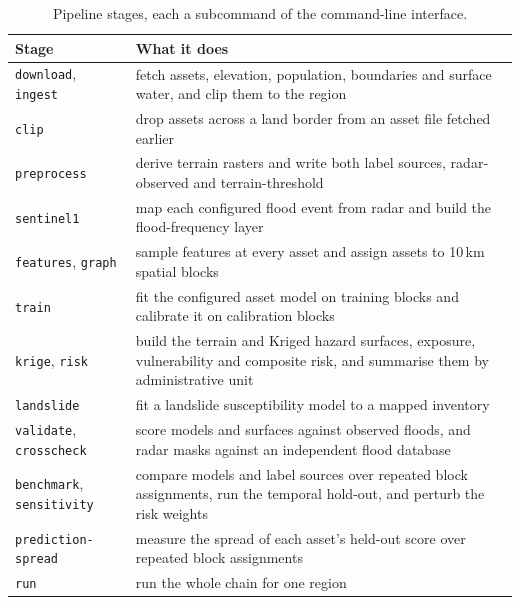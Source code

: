 \documentclass[preprint,12pt]{elsarticle}
\begin{document}
\begin{table}[!htbp]
\centering
\small
\begin{tabularx}{\textwidth}{@{}l>{\raggedright\arraybackslash}X@{}}
\toprule
Stage & What it does \\
\midrule
\texttt{download}, \texttt{ingest} & fetch assets, elevation, population, boundaries and surface water, and clip them to the region \\
\texttt{clip} & drop assets across a land border from an asset file fetched earlier \\
\texttt{preprocess} & derive terrain rasters and write both label sources, radar-observed and terrain-threshold \\
\texttt{sentinel1} & map each configured flood event from radar and build the flood-frequency layer \\
\texttt{features}, \texttt{graph} & sample features at every asset and assign assets to 10\,km spatial blocks \\
\texttt{train} & fit the configured asset model on training blocks and calibrate it on calibration blocks \\
\texttt{krige}, \texttt{risk} & build the terrain and Kriged hazard surfaces, exposure, vulnerability and composite risk, and summarise them by administrative unit \\
\texttt{landslide} & fit a landslide susceptibility model to a mapped inventory \\
\texttt{validate}, \texttt{crosscheck} & score models and surfaces against observed floods, and radar masks against an independent flood database \\
\texttt{benchmark}, \texttt{sensitivity} & compare models and label sources over repeated block assignments, run the temporal hold-out, and perturb the risk weights \\
\texttt{prediction-spread} & measure the spread of each asset's held-out score over repeated block assignments \\
\texttt{run} & run the whole chain for one region \\
\bottomrule
\end{tabularx}
\caption{Pipeline stages, each a subcommand of the command-line interface.}
\label{tab:stages}
\end{table}
\end{document}
